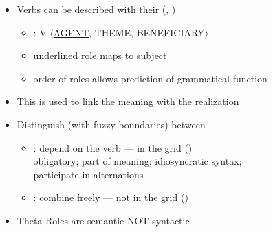 \documentclass[headrule,footrule]{foils}
\begin{document}
\begin{itemize}
\item Verbs can be described with their 
  (, )

 \begin{itemize}
 \item  {}: V $\langle$\ul{AGENT}, THEME, BENEFICIARY$\rangle$
 \item  underlined role maps to subject
 \item  order of roles allows prediction of grammatical function
 \end{itemize}
\item  This is used to link the meaning with the realization
\item Distinguish (with fuzzy boundaries) between
  \begin{itemize}
  \item {}: depend on the verb --- in the grid ()
    \\ obligatory; part of meaning; idiosyncratic syntax; 
 \\ participate in alternations 
  \item {}: combine freely --- not in the grid ()
    
  \end{itemize}
\item Theta Roles are semantic NOT syntactic
\end{itemize}
\end{document}
